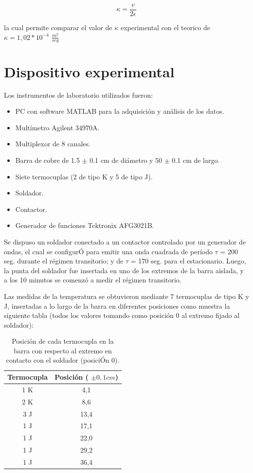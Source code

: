 \documentclass[twoside,twocolumn,a4paper]{article}
\begin{document}
\begin{equation}
\label{eq:kappa}
\kappa = \frac{v}{2\epsilon}
\end{equation}

la cual permite comparar el valor de $\kappa$ experimental con el teorico de $\kappa = 1,02*10^{-4}$ $\frac{m^{2}}{seg}$


\section{Dispositivo experimental}

Los instrumentos de laboratorio utilizados fueron:
\begin{itemize}
\item 
\label{Laser} PC con software MATLAB para la adquisici\'on y an\'alisis de los datos.
\item Mult\'imetro Agilent 34970A.
\item Multiplexor de 8 canales.
\item Barra de cobre de 1.5 $\pm$ 0.1 cm de di\'ametro y 50 $\pm$ 0.1 cm de largo.
\item Siete termocuplas (2 de tipo K y 5 de tipo J).
\item Soldador.
\item Contactor.
\item Generador de funciones Tektronix AFG3021B.
\end{itemize}

Se dispuso un soldador conectado a un contactor controlado por un generador de ondas, el cual se configur\'O para emitir una onda cuadrada de per\'iodo $\tau$ = 200 seg. durante el r\'egimen transitorio; y de $\tau$ = 170 seg. para el estacionario. Luego, la punta del soldador fue insertada en uno de los extremos de la barra aislada, y a los 10 minutos se comenz\'o a medir el r\'egimen transitorio. \newline

\par
Las medidas de la temperatura se obtuvieron mediante 7 termocuplas de tipo K y J, insertadas a lo largo de la barra en diferentes posiciones como muestra la siguiente tabla (todos los valores tomando como posici\'on 0 al extremo fijado al soldador):

\begin{table}[H]
\centering
\caption{Posici\'on de cada termocupla en la barra con respecto al extremo en contacto con el soldador (posici\'On 0).}
\label{tab:posiciones}
\begin{tabular}{|c|c|}
\hline
Termocupla & Posici\'on ( $\pm 0,1 cm$) \\ \hline
1 K & 4,1\\ \hline
2 K & 8,6\\ \hline
3 J & 13,4\\ \hline
1 J & 17,1\\ \hline
1 J & 22,0\\ \hline
1 J & 29,2\\ \hline
1 J & 36,4\\ \hline
\end{tabular}
\end{table}
\end{document}
